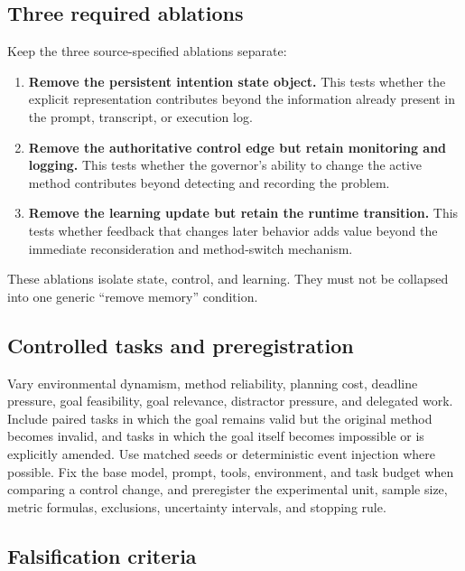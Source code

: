 \subsection{Three required ablations}

Keep the three source-specified ablations separate:

\begin{enumerate}
  \item \textbf{Remove the persistent intention state object.} This tests whether the explicit representation contributes beyond the information already present in the prompt, transcript, or execution log.
  \item \textbf{Remove the authoritative control edge but retain monitoring and logging.} This tests whether the governor's ability to change the active method contributes beyond detecting and recording the problem.
  \item \textbf{Remove the learning update but retain the runtime transition.} This tests whether feedback that changes later behavior adds value beyond the immediate reconsideration and method-switch mechanism.
\end{enumerate}

These ablations isolate state, control, and learning. They must not be collapsed into one generic ``remove memory'' condition.

\subsection{Controlled tasks and preregistration}

Vary environmental dynamism, method reliability, planning cost, deadline pressure, goal feasibility, goal relevance, distractor pressure, and delegated work. Include paired tasks in which the goal remains valid but the original method becomes invalid, and tasks in which the goal itself becomes impossible or is explicitly amended. Use matched seeds or deterministic event injection where possible. Fix the base model, prompt, tools, environment, and task budget when comparing a control change, and preregister the experimental unit, sample size, metric formulas, exclusions, uncertainty intervals, and stopping rule.

\subsection{Falsification criteria}

